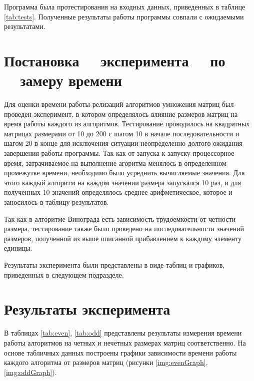 Программа была протестирования на входных данных, приведенных в таблице
\ref{tab:tests}. Полученные результаты работы программы совпали с ожидаемыми
результатами.

\section[Постановка эксперимента по замеру времени]
        {Постановка ~~эксперимента ~~по ~~замеру времени}

Для оценки времени работы релизаций алгоритмов умножения матриц был проведен
эксперимент, в котором определялось влияние размеров матриц на время работы
каждого из алгоритмов. Тестирование проводилось на квадратных матрицах размерами
от 10 до 200 с шагом 10 в начале последовательности и шагом 20 в конце для
исключения ситуации неопределенно долгого ожидания завершения работы программы.
Так как от запуска к запуску процессорное время, затрачиваемое на выполнение
агоритма менялось в определенном промежутке времени, необходимо было усреднить
вычисляемые значения. Для этого каждый алгоритм на каждом значении размера
запускался 10 раз, и для полученных 10 значений определялось среднее
арифметическое, которое и заносилось в таблицу результатов.

Так как в алгоритме Винограда есть зависимость трудоемкости от четности
размера, тестирование также было проведено на последовательности значений
размеров, полученной из выше описанной прибавлением к каждому элементу единицы.

Результаты эксперимента были представлены в виде таблиц и графиков, приведенных
в следующем подразделе.

\section{Результаты эксперимента}

В таблицах \ref{tab:even}, \ref{tab:odd} представлены результаты измерения
времени работы алгоритмов на четных и нечетных размерах матриц соответственно. На
основе табличных данных построены графики зависимости
времени работы каждого алгоритма от размеров матриц (рисунки \ref{img:evenGraph}, \ref{img:oddGraph}).

